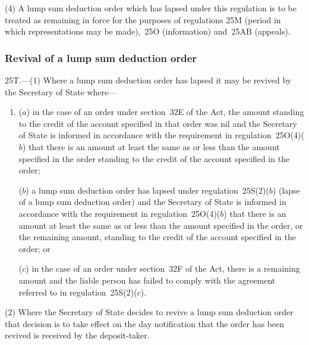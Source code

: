 \documentclass[12pt,a4paper]{article}
\begin{document}
(4) A lump sum deduction order which has lapsed under this regulation is to be treated as remaining in force for the purposes of regulations 25M (period in which representations may be made),~25O (information) and~25AB (appeals).


\subsubsection[25T. Revival of a lump sum deduction order]{Revival of a lump sum deduction order}

25T.---(1)  Where a lump sum deduction order has lapsed it may be revived by the 
Secretary of State  %
where—
\begin{enumerate}\item[]
($a$) in the case of an order under section~32E of the Act, the amount standing to the credit of the account specified in that order was nil and the 
Secretary of State  %
is informed in accordance with the requirement in regulation~25O(4)($b$)  that there is an amount at least the same as or less than the amount specified in the order standing to the credit of the account specified in the order;

($b$) a lump sum deduction order has lapsed under regulation~25S(2)($b$)  (lapse of a lump sum deduction order) and the 
Secretary of State  %
is informed in accordance with the requirement in regulation~25O(4)($b$)  that there is an amount at least the same as or less than the amount specified in the order, or the remaining amount, standing to the credit of the account specified in the order; or

($c$) in the case of an order under section~32F of the Act, there is a remaining amount and the liable person has failed to comply with the agreement referred to in regulation~25S(2)($c$).
\end{enumerate}

(2) Where the 
Secretary of State  %
decides to revive a lump sum deduction order that decision is to take effect on the day notification that the order has been revived is received by the deposit-taker.
\end{document}
